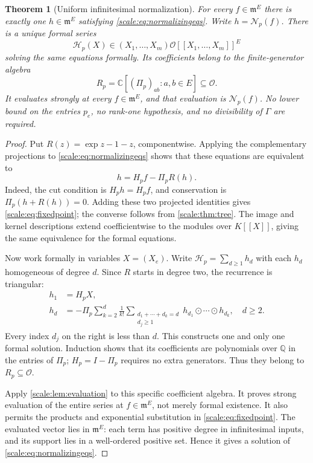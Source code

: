 \documentclass[11pt,a4paper]{article}
\numberwithin{equation}{section}
\newtheorem{theorem}{Theorem}[section]
\theoremstyle{definition}
\newcommand{\C}{\mathbb C}
\newcommand{\Q}{\mathbb Q}
\newcommand{\OO}{\mathcal O}
\newcommand{\mm}{\mathfrak m}
\newcommand{\NN}{\mathcal N}
\newcommand{\od}{\mathbin{\odot}}
\begin{document}
\begin{theorem}[Uniform infinitesimal normalization]
\label{scale:thm:existence}
For every $f\in\mm^E$ there is exactly one $h\in\mm^E$ satisfying
\eqref{scale:eq:normalizingeqs}. Write $h=\NN_p(f)$.
There is a unique formal series
\[
 \mathcal H_p(X)\in (X_1,\ldots,X_m)\OO[[X_1,\ldots,X_m]]^E
\]
solving the same equations formally. Its coefficients belong to the
finite-generator algebra
\begin{equation}\label{scale:eq:coeffring}
 R_p=\C[(\Pi_p)_{ab}:a,b\in E]\subseteq\OO.
\end{equation}
It evaluates strongly at every $f\in\mm^E$, and that evaluation is
$\NN_p(f)$. No lower bound on the entries $p_e$, no rank-one
hypothesis, and no divisibility of $\Gamma$ are required.
\end{theorem}
\begin{proof}
Put $R(z)=\exp z-1-z$, componentwise. Applying the complementary
projections to \eqref{scale:eq:normalizingeqs} shows that these
equations are equivalent to
\begin{equation}\label{scale:eq:fixedpoint}
 h=H_pf-\Pi_pR(h).
\end{equation}
Indeed, the cut condition is $H_ph=H_pf$, and conservation is
$\Pi_p(h+R(h))=0$. Adding these two projected identities gives
\eqref{scale:eq:fixedpoint}; the converse follows from
\cref{scale:thm:tree}. The image and kernel descriptions extend
coefficientwise to the modules over $K[[X]]$, giving the same equivalence
for the formal equations.

Now work formally in variables $X=(X_e)$. Write
$\mathcal H_p=\sum_{d\geq1}h_d$ with each $h_d$ homogeneous of degree
$d$. Since $R$ starts in degree two, the recurrence is triangular:
\begin{align}
 h_1&=H_pX,\label{scale:eq:recursionone}\\
 h_d&=-\Pi_p\sum_{k=2}^{d}\frac1{k!}
       \sum_{\substack{d_1+\cdots+d_k=d\\d_j\geq1}}
             h_{d_1}\od\cdots\od h_{d_k},\quad d\geq2.
             \label{scale:eq:recursion}
\end{align}
Every index $d_j$ on the right is less than $d$. This constructs one
and only one formal solution. Induction shows that its coefficients
are polynomials over $\Q$ in the entries of $\Pi_p$; $H_p=I-\Pi_p$
requires no extra generators. Thus they belong to $R_p\subseteq\OO$.

Apply \cref{scale:lem:evaluation} to this specific coefficient algebra.
It proves strong evaluation of the entire series at $f\in\mm^E$,
not merely formal existence. It also permits the products and
exponential substitution in \eqref{scale:eq:fixedpoint}. The evaluated
vector lies in $\mm^E$: each term has positive degree in infinitesimal
inputs, and its support lies in a well-ordered positive set. Hence
it gives a solution of \eqref{scale:eq:normalizingeqs}.


\end{proof}
\end{document}
